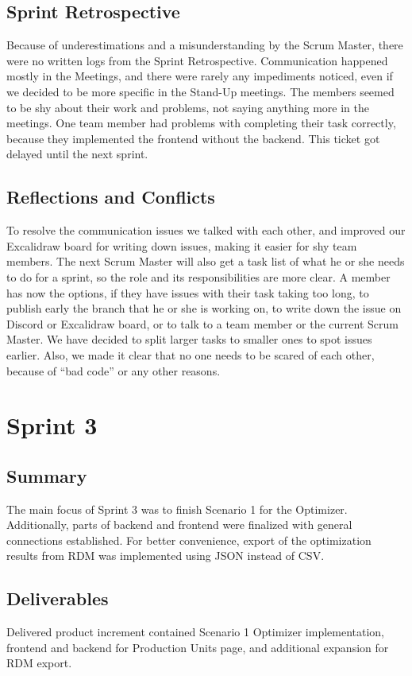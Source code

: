 \subsection*{Sprint Retrospective}
Because of underestimations and a misunderstanding by the Scrum Master, there were no written logs from the Sprint Retrospective.
Communication happened mostly in the Meetings, and there were rarely any impediments noticed, even if we decided to be more specific in the Stand-Up meetings.
The members seemed to be shy about their work and problems, not saying anything more in the meetings.
One team member had problems with completing their task correctly, because they implemented the frontend without the backend.
This ticket got delayed until the next sprint.

\subsection*{Reflections and Conflicts}
To resolve the communication issues we talked with each other, and improved our Excalidraw board for writing down issues, making it easier for shy team members.
The next Scrum Master will also get a task list of what he or she needs to do for a sprint, so the role and its responsibilities are more clear. 
A member has now the options, if they have issues with their task taking too long, to publish early the branch that he or she is working on, to write down the issue on Discord or Excalidraw board, or to talk to a team member or the current Scrum Master. 
We have decided to split larger tasks to smaller ones to spot issues earlier.
Also, we made it clear that no one needs to be scared of each other, because of “bad code” or any other reasons.

\section{Sprint 3}

\subsection*{Summary}
The main focus of Sprint 3 was to finish Scenario 1 for the Optimizer. Additionally, parts of backend and frontend were finalized with general connections established. For better convenience, export of the optimization results from RDM was implemented using JSON instead of CSV. 

\subsection*{Deliverables}
Delivered product increment contained Scenario 1 Optimizer implementation, frontend and backend for Production Units page, and additional expansion for RDM export.

